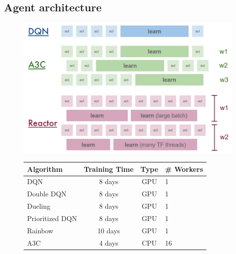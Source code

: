 \documentclass{article}
\begin{document}
\subsection{Agent architecture}\label{sec:agent_arch}
\begin{figure}[t]
\centering
\vspace{0pt}
\begin{minipage}{.35\textwidth}
\hspace{-20px}  \includegraphics[width=1.15\textwidth]{reactor_parallel}%
\end{minipage}
\begin{minipage}{.01\textwidth}
\hspace{2px}
\end{minipage}
\vspace{0pt}
\begin{minipage}{.55\textwidth}
\begin{tabular}{| l | c | c | l |}
\hline
Algorithm & Training Time & Type & \# Workers \\
\hline
\hline
\cellcolor{dqn_color} DQN & 8 days & GPU & 1  \\
\cellcolor{dqn_color}  Double DQN & 8 days & GPU & 1  \\
\cellcolor{dqn_color} Dueling & 8 days & GPU & 1  \\
\cellcolor{dqn_color} Prioritized DQN & 8 days & GPU & 1  \\
\cellcolor{dqn_color} Rainbow & 10 days & GPU & 1  \\
\cellcolor{ac_color} A3C & 4 days & CPU & 16 \\

\end{tabular}
\end{minipage}
\end{figure}
\end{document}
